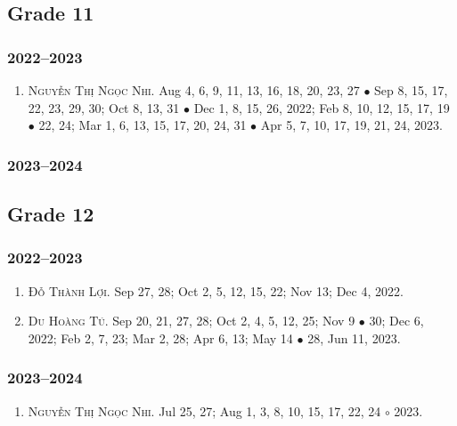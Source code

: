 \documentclass{article}
\begin{document}
\subsection{Grade 11}

\subsubsection{2022--2023}

\begin{enumerate}
	\item \textsc{Nguyễn Thị Ngọc Nhi.} {\sf[In]} Aug 4, 6, 9, 11, 13, 16, 18, 20, 23, 27 $\bullet$ Sep 8, 15, 17, 22, 23, 29, 30; Oct 8, 13, 31 $\bullet$ Dec 1, 8,  15, 26, 2022; Feb 8, 10, 12, 15, 17, 19 $\bullet$ 22, 24; Mar 1, 6, 13, 15, 17, 20, 24, 31 $\bullet$ Apr 5, 7, 10, 17, 19, 21, 24, 2023.
\end{enumerate}

\subsubsection{2023--2024}


\subsection{Grade 12}

\subsubsection{2022--2023}

\begin{enumerate}
	\item \textsc{Đỗ Thành Lợi.} {\sf[In]} Sep 27, 28; Oct 2, 5, 12, 15, 22; Nov 13; Dec 4, 2022. {\sf[Out]}
	\item \textsc{Du Hoàng Tú.} {\sf[In]} Sep 20, 21, 27, 28; Oct 2, 4, 5, 12, 25; Nov 9 $\bullet$ 30; Dec 6, 2022; Feb 2, 7, 23; Mar 2, 28; Apr 6, 13; May 14 $\bullet$ 28, Jun 11, 2023. {\sf[Out]}
\end{enumerate}

\subsubsection{2023--2024}

\begin{enumerate}
	\item \textsc{Nguyễn Thị Ngọc Nhi.} {\sf[In]} Jul 25, 27; Aug 1, 3, 8, 10, 15, 17, 22, 24 $\circ$ 2023.
\end{enumerate}
\end{document}

